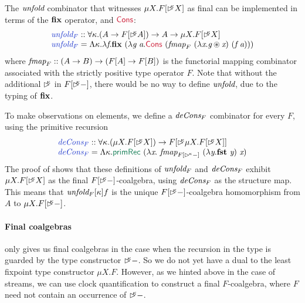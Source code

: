 The $\textit{unfold}$ combinator that witnesses $\mu X. F[\mathord{\rhd\kern-0.4em^{\kappa}}
X]$ as final can be implemented in terms of the $\textbf{fix}$ operator,
and $\cons{Cons}$:
\begin{displaymath}
  \begin{array}[t]{l}
    \defn{unfold$_F$} :: \forall \kappa. (A \to F[\delay\kappa A]) \to A \to \mu X. F[\delay\kappa X] \\
    \defn{unfold$_F$} = \Lambda \kappa.\lambda \ident{f}. \kw{fix}\ (\lambda \ident{g}\ \ident{a}. \cons{Cons}\ (\ident{fmap}_F\ (\lambda \ident{x}. \ident{g} \circledast \ident{x})\ (\ident{f}\ \ident{a})))
  \end{array}
\end{displaymath}
where $\textit{fmap}_F :: (A \to B) \to (F[A] \to F[B])$ is the
functorial mapping combinator associated with the strictly positive
type operator $F$. Note that without the additional $\mathord{\rhd\kern-0.4em^{\kappa}}$ in
$F[\mathord{\rhd\kern-0.4em^{\kappa}} -]$, there would be no way to define $\textit{unfold}$,
due to the typing of $\textbf{fix}$.

To make observations on elements, we define a $\textit{deCons$_F$}$
combinator for every $F$, using the primitive recursion
\begin{displaymath}
  \begin{array}{l}
    \defn{deCons$_F$} :: \forall \kappa. (\mu X. F[\delay\kappa X]) \to F[\delay\kappa \mu X. F[\delay\kappa X]] \\
    \defn{deCons$_F$} = \Lambda \kappa. \elim{primRec}\ (\lambda \ident{x}.\ \ident{fmap}_{F[\delayX\kappa-]}\ (\lambda \ident{y}.\kw{fst}\ \ident{y})\ \ident{x})
  \end{array}
\end{displaymath}
The proof of  shows that these
definitions of $\textit{unfold$_F$}$ and $\textit{deCons$_F$}$ exhibit
$\mu X. F[\mathord{\rhd\kern-0.4em^{\kappa}} X]$ as the final $F[\mathord{\rhd\kern-0.4em^{\kappa}}-]$-coalgebra,
using $\textit{deCons$_F$}$ as the structure map. This means that
$\textit{unfold$_F$}[\kappa] f$ is the unique $F[\mathord{\rhd\kern-0.4em^{\kappa}}-]$-coalgebra
homomorphism from $A$ to $\mu X. F[\mathord{\rhd\kern-0.4em^{\kappa}}-]$.

\paragraph{Final coalgebras}
 only gives us final coalgebras in
the case when the recursion in the type is guarded by the type
constructor $\mathord{\rhd\kern-0.4em^{\kappa}}-$. So we do not yet have a dual to the least
fixpoint type constructor $\mu X. F$. However, as we hinted above in
the case of streams, we can use clock quantification to construct a
final $F$-coalgebra, where $F$ need not contain an occurrence of
$\mathord{\rhd\kern-0.4em^{\kappa}}-$.

